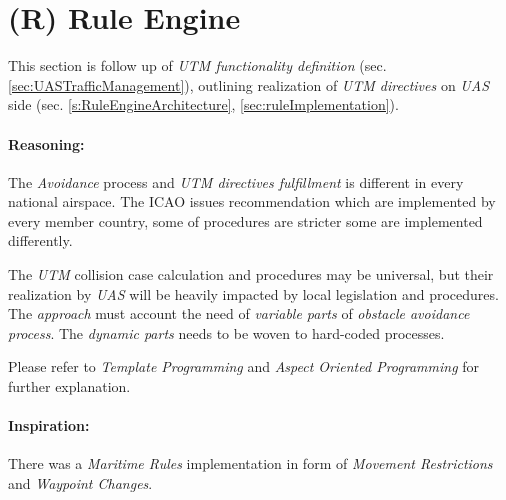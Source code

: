 \section{(R) Rule Engine}\label{sec:ruleEngine}

\noindent This section is follow up of \emph{UTM functionality definition} (sec. \ref{sec:UASTrafficManagement}), outlining realization of \emph{UTM directives} on \emph{UAS} side (sec. \ref{s:RuleEngineArchitecture},  \ref{sec:ruleImplementation}).

\paragraph{Reasoning:} The \emph{Avoidance} process and \emph{UTM directives fulfillment} is different in every national airspace. The ICAO issues recommendation \cite{icao4444,icaoAnnex2} which are implemented by every member country, some of procedures are stricter some are implemented differently.

The \emph{UTM} collision case calculation and procedures may be universal, but their realization by \emph{UAS} will be heavily impacted by local legislation and procedures.  The \emph{approach} must account the need of \emph{variable parts} of \emph{obstacle avoidance process}. The \emph{dynamic parts} needs to be woven to hard-coded processes. 

\begin{note}
	Please refer to \emph{Template Programming} and \emph{Aspect Oriented Programming} for further explanation.
\end{note}

\paragraph{Inspiration:} There was a \emph{Maritime Rules} implementation \cite{benjamin2006navigation} in form of \emph{Movement Restrictions} and \emph{Waypoint Changes}.
